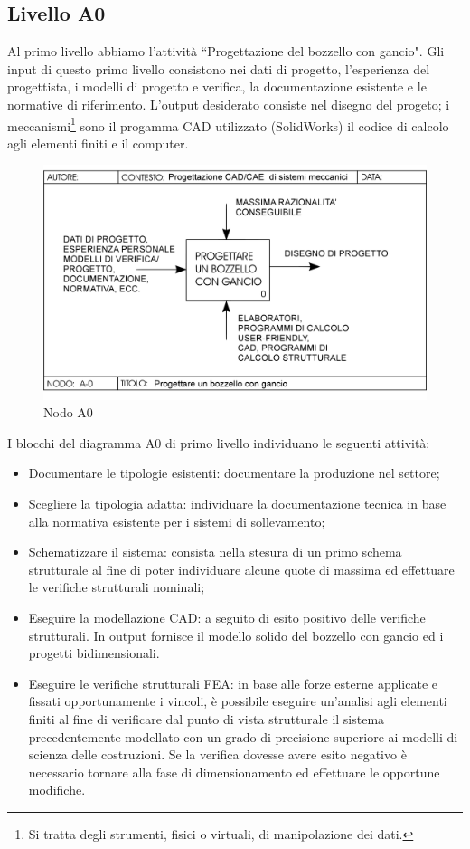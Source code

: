 \subsection{Livello A0}
Al primo livello abbiamo l'attività ``Progettazione del bozzello con gancio". Gli input di questo primo livello consistono nei dati di progetto, l'esperienza del progettista, i modelli di progetto e verifica, la documentazione esistente e le normative di riferimento. L'output desiderato consiste nel disegno del progeto; i meccanismi\footnote{Si tratta degli strumenti, fisici o virtuali, di manipolazione dei dati.} sono il progamma CAD utilizzato (SolidWorks) il codice di calcolo agli elementi finiti e il computer.
\begin{figure}[h!]
\centering
  \includegraphics[width=.6\textwidth]{imgs/schedaA0.pdf}
\caption{Nodo A0}
\label{fig:schedaA0}
\end{figure}
I blocchi del diagramma A0 di primo livello individuano le seguenti attività: 
\begin{itemize}
\item Documentare le tipologie esistenti: documentare la produzione nel settore;
\item Scegliere la tipologia adatta: individuare la documentazione tecnica in base alla normativa esistente per i sistemi di sollevamento;
\item Schematizzare il sistema: consista nella stesura di un primo schema strutturale al fine di poter individuare alcune quote di massima ed effettuare le verifiche strutturali nominali;
\item Eseguire la modellazione CAD: a seguito di esito positivo delle verifiche strutturali. In output fornisce il modello solido del bozzello con gancio ed i progetti bidimensionali. 
\item Eseguire le verifiche strutturali FEA: in base alle forze esterne applicate e fissati opportunamente i vincoli, è possibile eseguire un'analisi agli elementi finiti al fine di verificare dal punto di vista strutturale il sistema precedentemente modellato con un grado di precisione superiore ai modelli di scienza delle costruzioni. Se la verifica dovesse avere esito negativo è necessario tornare alla fase di dimensionamento ed effettuare le opportune modifiche. 
\end{itemize}
